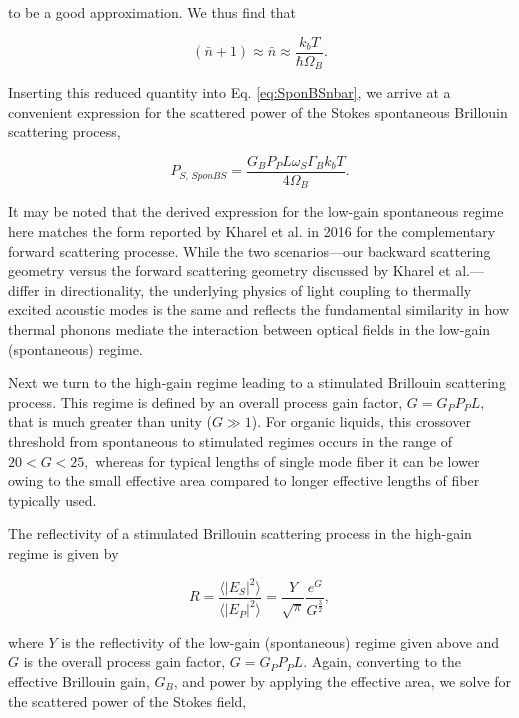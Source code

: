 to be a good approximation. We thus find that

\begin{equation}
(\bar{n} + 1) \approx \bar{n} \approx \frac{k_{b}T}{\hbar\Omega_{B}}.
\end{equation}

Inserting this reduced quantity into Eq. \ref{eq:SponBSnbar}, we arrive at a convenient expression for the scattered power of the Stokes spontaneous Brillouin scattering process,

\begin{equation}
  P_{S, \,\textit{SponBS}} = \frac{G_{B}P_{P}L\omega_{S}\Gamma_{B}k_{b}T}{4\Omega_{B}}.
\end{equation}

It may be noted that the derived expression for the low-gain spontaneous regime here matches the form reported by Kharel et al. in 2016 \cite{kharel2016noise} for the complementary forward scattering processe. While the two scenarios—our backward scattering geometry versus the forward scattering geometry discussed by Kharel et al.—differ in directionality, the underlying physics of light coupling to thermally excited acoustic modes is the same and reflects the fundamental similarity in how thermal phonons mediate the interaction between optical fields in the low-gain (spontaneous) regime.

Next we turn to the high-gain regime leading to a stimulated Brillouin scattering process. This regime is defined by an overall process gain factor, $G = G_{P}P_{P}L$, that is much greater than unity ($G \gg 1$). For organic liquids, this crossover threshold from spontaneous to stimulated regimes occurs in the range of $20 < G < 25,$\cite{boyd1990noise} whereas for typical lengths of single mode fiber it can be lower\cite{ippen1972stimulated} owing to the small effective area compared to longer effective lengths of fiber typically used.

The reflectivity of a stimulated Brillouin scattering process in the high-gain regime is given by \cite{boyd1990noise}

\begin{equation}
  R = \frac{\langle|E_{S}|^{2}\rangle}{\langle|E_{P}|^{2}\rangle} = \frac{Y}{\sqrt{\pi}}\frac{e^{G}}{G^{\frac{3}{2}}},
\end{equation}

where $Y$ is the reflectivity of the low-gain (spontaneous) regime given above and $G$ is the overall process gain factor, $G = G_{P}P_{P}L$. Again, converting to the effective Brillouin gain, $G_{B}$, and power by applying the effective area, we solve for the scattered power of the Stokes field,


